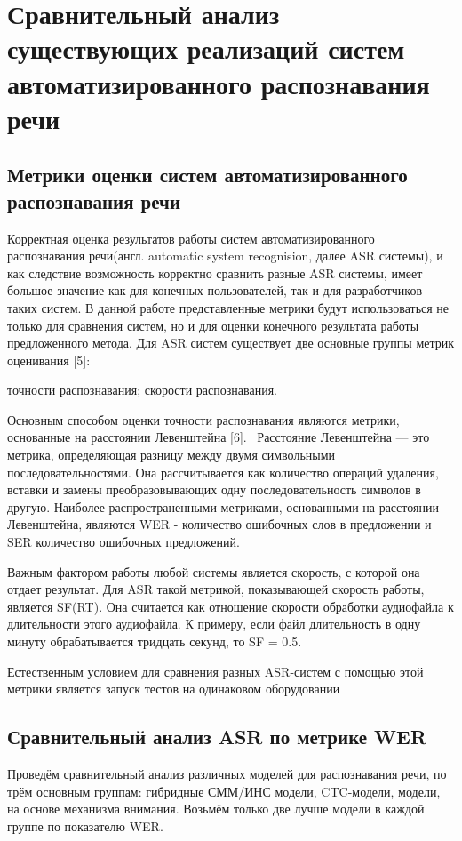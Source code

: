 \documentclass[conference]{IEEEtran}
\begin{document}
    \section{Сравнительный анализ существующих реализаций систем автоматизированного распознавания речи}

    \subsection{Метрики оценки систем автоматизированного распознавания речи}\label{AA}

    Корректная оценка результатов работы систем автоматизированного распознавания речи(англ. automatic system recognision, далее ASR системы), и как следствие возможность корректно сравнить разные ASR системы, имеет большое значение как для конечных пользователей, так и для разработчиков таких систем. В данной работе представленные метрики будут использоваться не только для сравнения систем, но и для оценки конечного результата работы предложенного метода.
    Для ASR систем существует две основные группы метрик оценивания [5]:
    \begin{itemize}
         точности распознавания;
         скорости распознавания.
    \end{itemize}

    Основным способом оценки точности распознавания являются метрики, основанные на расстоянии Левенштейна [6]. 
Расстояние Левенштейна — это метрика, определяющая разницу между двумя символьными последовательностями. Она рассчитывается как количество операций удаления, вставки и замены преобразовывающих одну последовательность символов в другую. Наиболее распространенными метриками, основанными на расстоянии Левенштейна, являются WER - количество ошибочных слов в предложении и SER количество ошибочных предложений.

Важным фактором работы любой системы является скорость, с которой она отдает результат. Для ASR такой метрикой, показывающей скорость работы, является SF(RT). Она считается как отношение скорости обработки аудиофайла к длительности этого аудиофайла. К примеру, если файл длительность в одну минуту обрабатывается тридцать секунд, то SF = 0.5.

Естественным условием для сравнения разных ASR-систем с помощью этой метрики является запуск тестов на одинаковом оборудовании

\subsection{Сравнительный анализ ASR по метрике WER}\label{AA}
Проведём сравнительный анализ различных моделей для распознавания речи, по трём основным группам: гибридные СММ/ИНС модели, CTC-модели, модели, на основе механизма внимания. Возьмём только две лучше модели в каждой группе по показателю WER.
\end{document}
